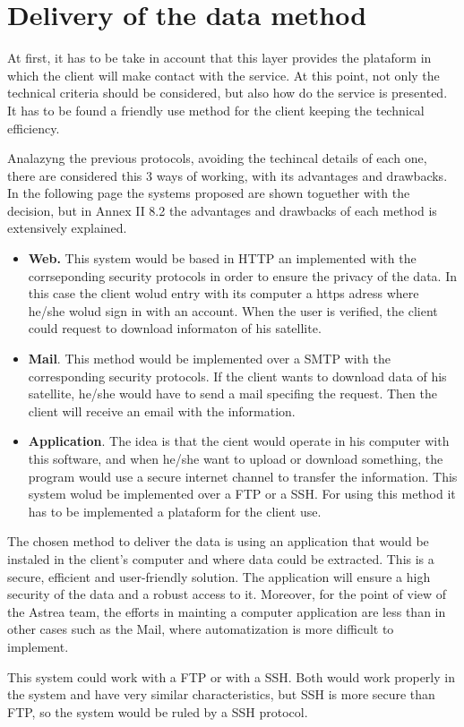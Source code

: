\section{Delivery of the data method} 
At first, it has to be take in account that this layer provides the plataform in which the client will make contact with the service. At this point, not only the technical criteria should be considered, but also how do the service is presented. It has to be found a friendly use method for the client keeping the technical efficiency.

Analazyng the previous protocols, avoiding the techincal details of each one, there are considered this 3 ways of working, with its advantages and drawbacks. In the following page the systems proposed are shown toguether with the decision, but in Annex II 8.2 the advantages and drawbacks of each method is extensively explained.
\begin{itemize}
\item \textbf{Web.} This system would be based in HTTP an implemented with the corrseponding security protocols in order to ensure the privacy of the data. In this case the client wolud entry with its computer a https adress where he/she wolud sign in with an account. When the user is verified, the client could request to download informaton of his satellite. 
\item \textbf{Mail}. This method would be implemented over a SMTP with the corresponding security protocols. If the client wants to download data of his satellite, he/she would have to send a mail specifing the request. Then the client will receive an email with the information.
\item \textbf{Application}.  The idea is that the cient would operate in his computer with this software, and when he/she want to upload or download something, the program would use a secure internet channel to transfer the information. This system wolud be implemented over a FTP or a SSH. For using this method it has to be implemented a plataform for the client use.
\end{itemize}

The chosen method to deliver the data is using an application that would be instaled in the client's computer and where data could be extracted. This is a secure, efficient and user-friendly solution. The application will ensure a high security of the data and a robust access to it. Moreover, for the point of view of the Astrea team, the efforts in mainting a computer application are less than in other cases such as the Mail, where automatization is more difficult to implement.

This system could work with a FTP or with a SSH. Both would work properly in the system and have very similar characteristics, but SSH is more secure than FTP, so the system would be ruled by a SSH protocol.